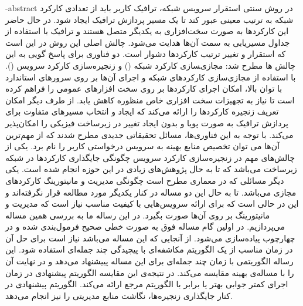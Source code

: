 
\fa-abstract{
    در روش سنتی استقرار سرویس شبکه، ترافیک کاربر باید از تعدادی کارکرد شبکه به ترتیب معینی عبور کند تا یک مسیر پردازش ترافیک ایجاد شود.
    در حال حاضر این کارکردها به صورت سخت‌افزاری به یکدیگر متصل هستند و ترافیک با استفاده از جداول مسیریابی به سمت آن‌ها هدایت می‌شود.
    چالش اصلی این روش در این است که استقرار و تغییر ترتیب کارکردها دشوار است.
    دو فناوری برای پاسخ گویی به این چالش ها مطرح شد:
    مجازی‌‍سازی کارکرد شبکه () و زنجیره‌سازی کارکرد سرویس ().
    با استفاده از مجازی‌سازی کارکردهای شبکه و اجرای آن‌ها بر روی سرورهای استاندارد با توان بالا، امکان اجرای کارکردها بر روی سخت افزارهای عمومی را فراهم کرده است
    تا نیاز به تجهیزات سخت افزاری خاص منظوره کاهش یابد.
    از طرف دیگر  امکان تعریف زنجیره کارکردها را ارائه می‌کند
    که ایجاد و انتخاب مسیرهای متفاوت برای پردازش ترافیک به صورت پویا و بدون ایجاد تغییر در زیرساخت فیزیکی را امکان‌پذیر می‌کند.
    با توجه به این فناوری‌ها، مسائل تحقیقاتی جدیدی مطرح شدند که از مهم‌ترین آن‌ها می توان تخصیص منابع بهینه به سرویس درخواستی کاربر را نام برد.
    یکی از چالش‌های مهم در زنجیره‌سازی کارکرد سرویس چگونگی جایگذاری کارکرد‌ها در شبکه زیرساخت می‌باشد که تا به حال پژوهش‌های زیادی در این حوزه انجام شده است.
    یکی دیگر مسائلی که در معماری  مطرح است چگونگی مدیریت و مانیتورینگ کارکردهای مجازی می‌باشد. تا به حال این دو مساله در کنار یکدیگر مورد مطالعه قرار نگرفته‌اند
    و این در حالی است که برای ارائه سرویس‌هایی با کیفیت مناسب نیاز است که مدیریت و مانیتورینگ بر روی آن‌ها صورت بگیرد.
    در این رساله ما به بررسی همین مساله می‌پردازیم.
    در اولین گام مساله فوق به صورت خطی صحیح فرمول‌بندی شده و در چهارچوب  پیاده‌سازی می‌شود.
    از آنجایی که این مساله  می‌باشد نیاز است برای حل آن در زمان مناسب از یک الگوریتم مکاشفه‌ای با پیچیدگی چند جمله‌ای استفاده شود.
    این رساله الگوریتمی با زمان چند جمله‌ای برای این مساله پییشنهاد می‌دهد و در نهایت آن را با مساله‌ی بهینه مقایسه می‌کند.  
    در نتیجه‌ی این مقایسه الگوریتم پیشنهادی در زمان اجرای کمتر جوابی بهتر یا برابر با الگوریتم مرجع \cite{Bari2015}
    ارائه می‌کند. الگوریتم پیشنهادی در کنار جایگذاری زنجیره‌ها، نگاشت منابع مدیریتی را نیز انجام می‌دهد.
}





\AUTtitle
